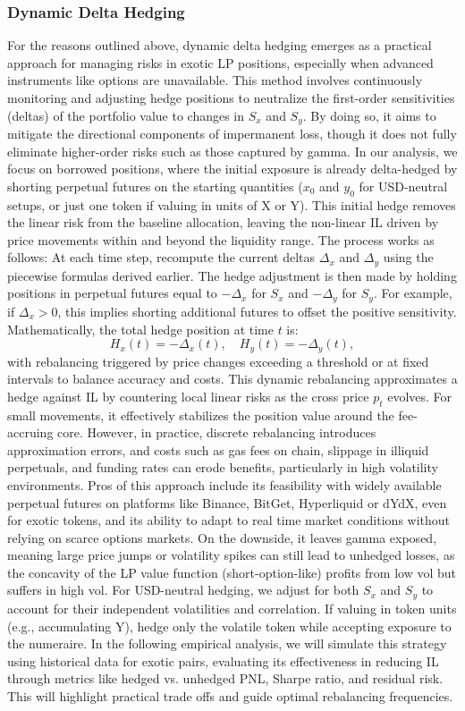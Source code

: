 \documentclass{article}
\begin{document}
\subsubsection{Dynamic Delta Hedging}
For the reasons outlined above, dynamic delta hedging emerges as a practical approach for managing risks in exotic LP positions, especially when advanced instruments like options are unavailable. This method involves continuously monitoring and adjusting hedge positions to neutralize the first-order sensitivities (deltas) of the portfolio value to changes in $S_x$ and $S_y$. By doing so, it aims to mitigate the directional components of impermanent loss, though it does not fully eliminate higher-order risks such as those captured by gamma.
In our analysis, we focus on borrowed positions, where the initial exposure is already delta-hedged by shorting perpetual futures on the starting quantities ($x_0$ and $y_0$ for USD-neutral setups, or just one token if valuing in units of X or Y). This initial hedge removes the linear risk from the baseline allocation, leaving the non-linear IL driven by price movements within and beyond the liquidity range.
The process works as follows: At each time step, recompute the current deltas $\Delta_x$ and $\Delta_y$ using the piecewise formulas derived earlier. The hedge adjustment is then made by holding positions in perpetual futures equal to $-\Delta_x$ for $S_x$ and $-\Delta_y$ for $S_y$. For example, if $\Delta_x > 0$, this implies shorting additional futures to offset the positive sensitivity. Mathematically, the total hedge position at time $t$ is:
$$H_x(t) = -\Delta_x(t), \quad H_y(t) = -\Delta_y(t),$$
with rebalancing triggered by price changes exceeding a threshold or at fixed intervals to balance accuracy and costs.
This dynamic rebalancing approximates a hedge against IL by countering local linear risks as the cross price $p_t$ evolves. For small movements, it effectively stabilizes the position value around the fee-accruing core. However, in practice, discrete rebalancing introduces approximation errors, and costs such as gas fees on chain, slippage in illiquid perpetuals, and funding rates can erode benefits, particularly in high volatility environments.
Pros of this approach include its feasibility with widely available perpetual futures on platforms like Binance, BitGet, Hyperliquid or dYdX, even for exotic tokens, and its ability to adapt to real time market conditions without relying on scarce options markets. On the downside, it leaves gamma exposed, meaning large price jumps or volatility spikes can still lead to unhedged losses, as the concavity of the LP value function (short-option-like) profits from low vol but suffers in high vol.
For USD-neutral hedging, we adjust for both $S_x$ and $S_y$ to account for their independent volatilities and correlation. If valuing in token units (e.g., accumulating Y), hedge only the volatile token while accepting exposure to the numeraire.
In the following empirical analysis, we will simulate this strategy using historical data for exotic pairs, evaluating its effectiveness in reducing IL through metrics like hedged vs. unhedged PNL, Sharpe ratio, and residual risk. This will highlight practical trade offs and guide optimal rebalancing frequencies.
\newpage
\end{document}
